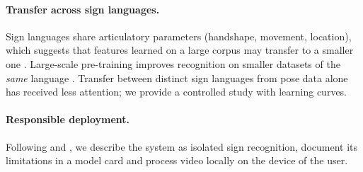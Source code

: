 \paragraph{Transfer across sign languages.}
Sign languages share articulatory parameters (handshape, movement, location), which suggests that
features learned on a large corpus may transfer to a smaller one \citep{yosinski2014transferable}.
Large-scale pre-training improves recognition on smaller datasets of the \emph{same} language
\citep{albanie2020bsl1k}. Transfer between distinct sign languages from pose data alone has
received less attention; we provide a controlled study with learning curves.

\paragraph{Responsible deployment.}
Following \citet{bragg2019interdisciplinary} and \citet{yin2021including}, we describe the system as
isolated sign recognition, document its limitations in a model card \citep{mitchell2019modelcards}
and process video locally on the device of the user.
